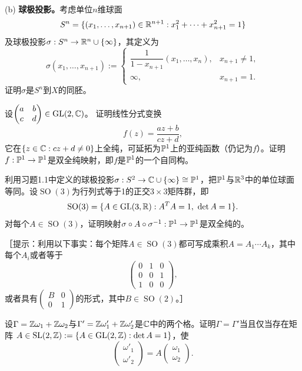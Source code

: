 (b) \textbf{球极投影。}考虑单位$n$维球面
\[
S^n=\{(x_1,\ldots,x_{n+1})\in\mathbb R^{n+1}:x_1^2+\cdots+x_{n+1}^2=1\}
\]
及球极投影$\sigma:S^n\to\mathbb R^n\cup\{\infty\}$，其定义为
\[
\sigma(x_1,\ldots,x_{n+1}):=\begin{cases}
\dfrac{1}{1-x_{n+1}}(x_1,\ldots,x_n),&x_{n+1}\ne1,\\
\infty,&x_{n+1}=1.
\end{cases}
\]
证明$\sigma$是$S^n$到$X$的同胚。

设$\begin{pmatrix}a&b\\c&d\end{pmatrix}\in\operatorname{GL}(2,\mathbb C)$。
证明线性分式变换
\[
f(z)=\frac{az+b}{cz+d},
\]
它在$\{z\in\mathbb C:cz+d\ne0\}$上全纯，可延拓为$\mathbb P^1$上的亚纯函数（仍记为$f$）。证明$f:\mathbb P^1\to\mathbb P^1$是双全纯映射，即$f$是$\mathbb P^1$的一个自同构。

利用习题1.1中定义的球极投影$\sigma:S^2\to\mathbb C\cup\{\infty\}\cong\mathbb P^1$，把$\mathbb P^1$与$\mathbb R^3$中的单位球面等同。设$\operatorname{SO}(3)$为行列式等于1的正交$3\times3$矩阵群，即
\[
\operatorname{SO}(3)=\{A\in\operatorname{GL}(3,\R):A^TA=1,\ \det A=1\}.
\]
对每个$A\in\operatorname{SO}(3)$，证明映射$\sigma\circ A\circ\sigma^{-1}:\mathbb P^1\to\mathbb P^1$是双全纯的。

［提示：利用以下事实：每个矩阵$A\in\operatorname{SO}(3)$都可写成乘积$A=A_1\cdots A_k$，其中每个$A_i$或者等于
\[
\begin{pmatrix}0&1&0\\0&0&1\\1&0&0\end{pmatrix},
\]
或者具有$\begin{pmatrix}B&0\\0&1\end{pmatrix}$的形式，其中$B\in\operatorname{SO}(2)$。］

设$\Gamma=\mathbb Z\omega_1+\mathbb Z\omega_2$与$\Gamma'=\mathbb Z\omega'_1+\mathbb Z\omega'_2$是$\mathbb C$中的两个格。证明$\Gamma=\Gamma'$当且仅当存在矩阵
$A\in\operatorname{SL}(2,\mathbb Z):=\{A\in\operatorname{GL}(2,\mathbb Z):\det A=1\}$，使
\[
\begin{pmatrix}\omega'_1\\\omega'_2\end{pmatrix}
=A\begin{pmatrix}\omega_1\\\omega_2\end{pmatrix}.
\]

